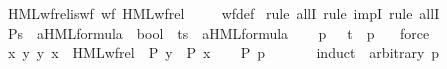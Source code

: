 \begin{isabellebody}
\isanewline
{}\isamarkupfalse%
\ HML{\isacharunderscore}{\kern0pt}wf{\isacharunderscore}{\kern0pt}rel{\isacharunderscore}{\kern0pt}is{\isacharunderscore}{\kern0pt}wf{\isacharcolon}{\kern0pt}\ {\isacartoucheopen}wf\ HML{\isacharunderscore}{\kern0pt}wf{\isacharunderscore}{\kern0pt}rel{\isacartoucheclose}\ \isanewline
%
\isadelimproof
\ \ %
\endisadelimproof
%
\isatagproof
{}\isamarkupfalse%
\ wf{\isacharunderscore}{\kern0pt}def\isanewline
{}\isamarkupfalse%
\ {\isacharparenleft}{\kern0pt}rule\ allI{\isacharcomma}{\kern0pt}\ rule\ impI{\isacharcomma}{\kern0pt}\ rule\ allI{\isacharparenright}{\kern0pt}\isanewline
\ \ \isamarkupfalse%
\ P{\isacharcolon}{\kern0pt}{\isacharcolon}{\kern0pt}{\isacartoucheopen}{\isacharprime}{\kern0pt}s\ {\isasymtimes}\ {\isacharparenleft}{\kern0pt}{\isacharprime}{\kern0pt}a{\isacharparenright}{\kern0pt}HML{\isacharunderscore}{\kern0pt}formula\ {\isasymRightarrow}\ bool{\isacartoucheclose}\ \ t{\isacharcolon}{\kern0pt}{\isacharcolon}{\kern0pt}{\isacartoucheopen}{\isacharprime}{\kern0pt}s\ {\isasymtimes}\ {\isacharparenleft}{\kern0pt}{\isacharprime}{\kern0pt}a{\isacharparenright}{\kern0pt}HML{\isacharunderscore}{\kern0pt}formula{\isacartoucheclose}\isanewline
\ \ \isamarkupfalse%
\ p\ {\isasymphi}\ \ {\isacartoucheopen}t\ {\isacharequal}{\kern0pt}\ {\isacharparenleft}{\kern0pt}p{\isacharcomma}{\kern0pt}\ {\isasymphi}{\isacharparenright}{\kern0pt}{\isacartoucheclose}\ \isamarkupfalse%
\ force\isanewline
\ \ \isamarkupfalse%
\ {\isacartoucheopen}{\isasymforall}x{\isachardot}{\kern0pt}\ {\isacharparenleft}{\kern0pt}{\isasymforall}y{\isachardot}{\kern0pt}\ {\isacharparenleft}{\kern0pt}y{\isacharcomma}{\kern0pt}\ x{\isacharparenright}{\kern0pt}\ {\isasymin}\ HML{\isacharunderscore}{\kern0pt}wf{\isacharunderscore}{\kern0pt}rel\ {\isasymlongrightarrow}\ P\ y{\isacharparenright}{\kern0pt}\ {\isasymlongrightarrow}\ P\ x{\isacartoucheclose}\isanewline
\ \ \isamarkupfalse%
\ {\isacartoucheopen}P\ {\isacharparenleft}{\kern0pt}p{\isacharcomma}{\kern0pt}\ {\isasymphi}{\isacharparenright}{\kern0pt}{\isacartoucheclose}\isanewline
\ \ \ \ \isamarkupfalse%
\ {\isacharparenleft}{\kern0pt}induct\ {\isasymphi}\ arbitrary{\isacharcolon}{\kern0pt}\ p{\isacharparenright}{\kern0pt}\isanewline
\ \ \ \ \isamarkupfalse%

\end{isabellebody}
